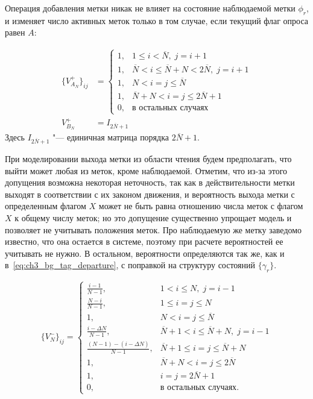 Операция добавления метки никак не влияет на состояние наблюдаемой метки $\phi_r$, и изменяет число активных меток только в том случае, если текущий флаг опроса равен $A$:

\begin{equation}\label{eq:ch3_fg_tag_arrival}
	\begin{aligned}
		\{ V_{A_N}^+ \}_{ij} &= \begin{cases}
 			1, & 1 \leqslant i < \overline{N},\; j = i + 1\\
 			1, & \overline{N} < i \leqslant \overline{N} + N  < 2\overline{N},\; j = i + 1\\
	 		1, & N < i = j \leqslant \overline{N}\\
 			1, & \overline{N} + N < i = j \leqslant 2\overline{N} + 1\\
 			0, & \text{в остальных случаях}
	 	\end{cases}\\
	 	V_{B_N}^+ &= I_{2\overline{N}+1}
	\end{aligned}
\end{equation}
Здесь $I_{2\overline{N}+1}$ "--- единичная матрица порядка $2\overline{N}+1$.

При моделировании выхода метки из области чтения будем предполагать, что выйти может любая из меток, кроме наблюдаемой. Отметим, что из-за этого допущения возможна некоторая неточность, так как в действительности метки выходят в соответствии с их законом движения, и вероятность выхода метки с определенным флагом $X$ может не быть равна отношению числа меток с флагом $X$ к общему числу меток; но это допущение существенно упрощает модель и позволяет не учитывать положения меток. Про наблюдаемую же метку заведомо известно, что она остается в системе, поэтому при расчете вероятностей ее учитывать не нужно. В остальном, вероятности определяются так же, как и в~\eqref{eq:ch3_bg_tag_departure}, с поправкой на структуру состояний $\{ \gamma_r \}$.

\begin{equation}\label{eq:ch3_fg_tag_departure}
	\{ V_N^- \}_{ij} = \begin{cases}
 		\frac{i-1}{N-1}, & 1 < i \leqslant N,\; j = i - 1\\
 		\frac{N-i}{N-1}, & 1 \leqslant i = j \leqslant N\\
 		1,               & N < i = j \leqslant \overline{N}\\
 		\frac{i - \Delta N}{N - 1},            & \overline{N} + 1 < i \leqslant \overline{N} + N,\; j = i - 1\\
 		\frac{(N-1) - (i - \Delta N)}{N - 1},  & \overline{N} + 1 \leqslant i = j \leqslant \overline{N} + N\\
 		1,               & \overline{N} + N < i = j \leqslant 2\overline{N}\\
 		1,               & i = j = 2\overline{N}+1\\
 		0,               & \text{в остальных случаях}.
 	\end{cases}
\end{equation}





